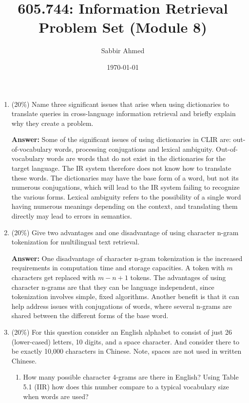 \documentclass[11pt]{article}
\title{605.744: Information Retrieval \\ Problem Set (Module 8)}
\author{Sabbir Ahmed}
\date{\today}
\begin{document}
\maketitle

    \begin{enumerate}

        \item (20\%) Name three significant issues that arise when using dictionaries to translate queries in cross-language information retrieval and briefly explain why they create a problem.

        \textbf{Answer:} Some of the significant issues of using dictionaries in CLIR are: out-of-vocabulary words, processing conjugations and lexical ambiguity. Out-of-vocabulary words are words that do not exist in the dictionaries for the target language. The IR system therefore does not know how to translate these words. The dictionaries may have the base form of a word, but not its numerous conjugations, which will lead to the IR system failing to recognize the various forms. Lexical ambiguity refers to the possibility of a single word having numerous meanings depending on the context, and translating them directly may lead to errors in semantics.

        \item (20\%) Give two advantages and one disadvantage of using character n-gram tokenization for multilingual text retrieval.

        \textbf{Answer:} One disadvantage of character n-gram tokenization is the increased requirements in computation time and storage capacities. A token with $m$ characters get replaced with $m-n+1$ tokens. The advantages of using character n-grams are that they can be language independent, since tokenization involves simple, fixed algorithms. Another benefit is that it can help address issues with conjugations of words, where several n-grams are shared between the different forms of the base word.

        \item (20\%) For this question consider an English alphabet to consist of just 26 (lower-cased) letters, 10 digits, and a space character. And consider there to be exactly 10,000 characters in Chinese. Note, spaces are not used in written Chinese.

        \begin{enumerate}
            \item How many possible character 4-grams are there in English? Using Table 5.1 (IIR) how does this number compare to a typical vocabulary size when words are used?


\end{enumerate}
\end{enumerate}
\end{document}
